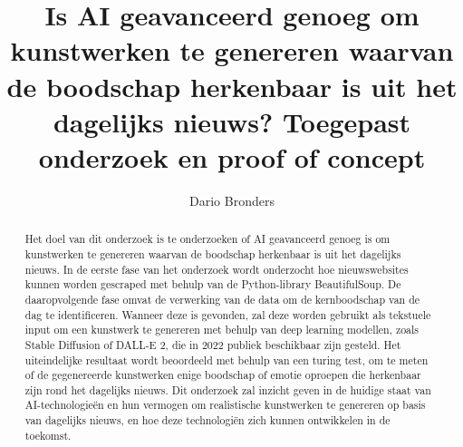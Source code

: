 \documentclass{hogent-article}
\title{Is AI geavanceerd genoeg om kunstwerken te genereren waarvan de boodschap herkenbaar is uit het dagelijks nieuws? Toegepast onderzoek en proof of concept}
\author{Dario Bronders}
\begin{document}
\begin{abstract}
Het doel van dit onderzoek is te onderzoeken of AI geavanceerd genoeg is om kunstwerken te genereren waarvan de boodschap herkenbaar is uit het dagelijks nieuws. In de eerste fase van het onderzoek wordt onderzocht hoe nieuwswebsites kunnen worden gescraped met behulp van de Python-library BeautifulSoup. De daaropvolgende fase omvat de verwerking van de data om de kernboodschap van de dag te identificeren. Wanneer deze is gevonden, zal deze worden gebruikt als tekstuele input om een kunstwerk te genereren met behulp van deep learning modellen, zoals Stable Diffusion of DALL-E 2, die in 2022 publiek beschikbaar zijn gesteld. Het uiteindelijke resultaat wordt beoordeeld met behulp van een turing test, om te meten of de gegenereerde kunstwerken enige boodschap of emotie oproepen die herkenbaar zijn rond het dagelijks nieuws. Dit onderzoek zal inzicht geven in de huidige staat van AI-technologieën en hun vermogen om realistische kunstwerken te genereren op basis van dagelijks nieuws, en hoe deze technologiën zich kunnen ontwikkelen in de toekomst.
\end{abstract}

\tableofcontents



\printbibliography[heading=bibintoc]
\end{document}
